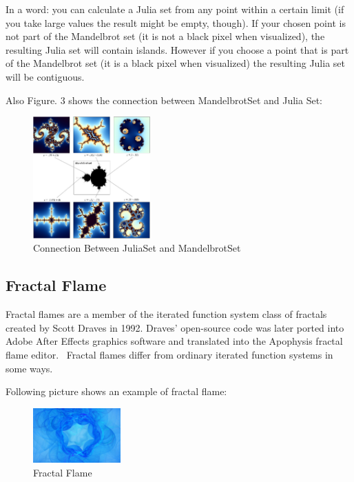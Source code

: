 \documentclass[fleqn,10pt]{SelfArx} %
\begin{document}
In a word: you can calculate a Julia set from any point within a
certain limit (if you take large values the result might be empty,
though). If your chosen point is not part of the Mandelbrot set (it is
not a black pixel when visualized), the resulting Julia set will
contain islands. However if you choose a point that is part of the
Mandelbrot set (it is a black pixel when visualized) the resulting
Julia set will be contiguous.

Also Figure. 3 shows
the connection between MandelbrotSet and Julia Set:



\begin{figure}[h!]
  \centering
      \includegraphics[width=0.4\textwidth]{julia_mandel.jpg}
  \caption{Connection Between JuliaSet and MandelbrotSet}
\end{figure}


\subsection{Fractal Flame}
Fractal flames are a member of the iterated function system class of
fractals created by Scott Draves in 1992. Draves' open-source code was
later ported into Adobe After Effects graphics software and translated
into the Apophysis fractal flame editor.~\cite{fractal_flames}
Fractal flames differ from ordinary iterated function systems in some
ways.

Following picture shows an example of fractal flame:

\begin{figure}[h!]
  \centering
      \includegraphics[width=0.3\textwidth]{fractal_flame.jpg}
  \caption{Fractal Flame}
\end{figure}
\end{document}
